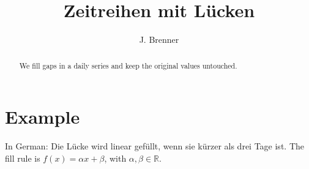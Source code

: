\documentclass[11pt]{article}
\title{Zeitreihen mit Lücken}
\author{J. Brenner}
\date{}
\begin{document}
\maketitle

\begin{abstract}
We fill gaps in a daily series and keep the original values untouched.
\end{abstract}



\section{Example}
In German: \foreignlanguage{german}{Die Lücke wird linear gefüllt, wenn sie kürzer als drei Tage ist.}
The fill rule is $f(x) = α x + β$, with $α, β ∈ ℝ$.
\end{document}

